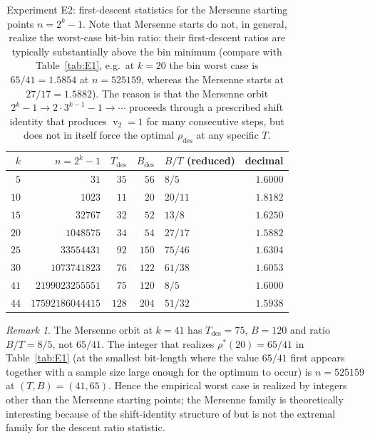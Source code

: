 \documentclass[11pt,a4paper]{article}
\theoremstyle{definition}
\theoremstyle{remark}
\newtheorem{remark}[theorem]{Remark}
\DeclareMathOperator{\val}{v}
\begin{document}
\begin{table}[htbp]
\centering
\begin{tabular}{r r r r l r}
\toprule
$k$ & $n = 2^k - 1$ & $T_{\mathrm{des}}$ & $B_{\mathrm{des}}$
  & $B/T$ (reduced) & decimal \\
\midrule
$5$  & $31$            & $35$  & $56$  & $8/5$    & $1.6000$ \\
$10$ & $1023$          & $11$  & $20$  & $20/11$  & $1.8182$ \\
$15$ & $32767$         & $32$  & $52$  & $13/8$   & $1.6250$ \\
$20$ & $1048575$       & $34$  & $54$  & $27/17$  & $1.5882$ \\
$25$ & $33554431$      & $92$  & $150$ & $75/46$  & $1.6304$ \\
$30$ & $1073741823$    & $76$  & $122$ & $61/38$  & $1.6053$ \\
$41$ & $2199023255551$ & $75$  & $120$ & $8/5$    & $1.6000$ \\
$44$ & $17592186044415$& $128$ & $204$ & $51/32$  & $1.5938$ \\
\bottomrule
\end{tabular}
\caption{Experiment E2: first-descent statistics for the Mersenne
starting points $n = 2^k - 1$.  Note that Mersenne starts do not, in
general, realize the worst-case bit-bin ratio: their first-descent
ratios are typically substantially above the bin minimum (compare
with Table~\ref{tab:E1}, e.g.\ at $k = 20$ the bin worst case is
$65/41 = 1.5854$ at $n = 525159$, whereas the Mersenne starts at
$27/17 = 1.5882$).  The reason is that the Mersenne orbit
$2^k - 1 \to 2 \cdot 3^{k-1} - 1 \to \cdots$ proceeds through a
prescribed shift identity that produces $\val_2 = 1$ for many
consecutive steps, but does not in itself force the optimal
$\rho_{\mathrm{des}}$ at any specific $T$.}
\label{tab:E2}
\end{table}

\begin{remark}\label{rem:mersenne-not-saturating}
The Mersenne orbit at $k = 41$ has $T_{\mathrm{des}} = 75$, $B = 120$
and ratio $B/T = 8/5$, not $65/41$.  The integer that realizes
$\rho^{*}(20) = 65/41$ in Table~\ref{tab:E1} (at the smallest
bit-length where the value $65/41$ first appears together with a
sample size large enough for the optimum to occur) is
$n = 525159$ at $(T, B) = (41, 65)$.  Hence the empirical worst case
is realized by integers other than the Mersenne starting points; the
Mersenne family is theoretically interesting because of the
shift-identity structure of \cite{ChangPaperA} but is not the
extremal family for the descent ratio statistic.
\end{remark}
\end{document}
